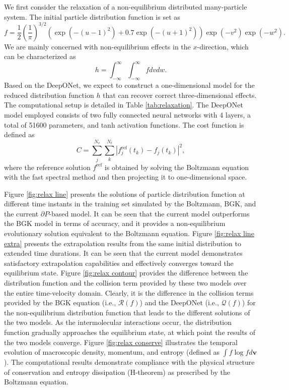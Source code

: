 \documentclass[preprint,3p,12pt,sort&compress]{elsarticle}
\begin{document}
We first consider the relaxation of a non-equilibrium distributed many-particle system.
The initial particle distribution function is set as
\begin{equation}
    f = \frac{1}{2}\left(\frac{1}{\pi}\right)^{3/2}(\exp(-(u-1)^2)+0.7\exp(-(u+1)^2))\exp(-v^2)\exp(-w^2).
    \label{eq:initial pdf}
\end{equation}
We are mainly concerned with non-equilibrium effects in the $x$-direction, which can be characterized as
\begin{equation}
    h=\int_{-\infty}^\infty \int_{-\infty}^\infty f dvdw.
\end{equation}
Based on the DeepONet, we expect to construct a one-dimensional model for the reduced distribution function $h$ that can recover correct three-dimensional effects.
The computational setup is detailed in Table \ref{tab:relaxation}.
The DeepONet model employed consists of two fully connected neural networks with 4 layers, a total of 51600 parameters, and tanh activation functions.
The cost function is defined as
\begin{equation}
    C = \sum_j^{N_v}\sum_k^{N_t} |f_{j}^{\mathrm{ref}}(t_k)-f_{j}(t_k)|^2,
\end{equation}
where the reference solution $f^\mathrm{ref}$ is obtained by solving the Boltzmann equation with the fast spectral method \cite{mouhot2006fast,wu2013deterministic} and then projecting it to one-dimensional space.

Figure \ref{fig:relax line} presents the solutions of particle distribution function at different time instants in the training set simulated by the Boltzmann, BGK, and the current $\partial P$-based model.
It can be seen that the current model outperforms the BGK model in terms of accuracy, and it provides a non-equilibrium evolutionary solution equivalent to the Boltzmann equation.
Figure \ref{fig:relax line extra} presents the extrapolation results from the same initial distribution to extended time durations.
It can be seen that the current model demonstrates satisfactory extrapolation capabilities and effectively converges toward the equilibrium state.
Figure \ref{fig:relax contour} provides the difference between the distribution function and the collision term provided by these two models over the entire time-velocity domain.
Clearly, it is the difference in the collision terms provided by the BGK equation (i.e., $\mathcal R(f)$) and the DeepONet (i.e., $\mathcal Q(f)$) for the non-equilibrium distribution function that leads to the different solutions of the two models.
As the intermolecular interactions occur, the distribution function gradually approaches the equilibrium state, at which point the results of the two models converge.
Figure \ref{fig:relax conserve} illustrates the temporal evolution of macroscopic density, momentum, and entropy (defined as $\int f \log f d\mathbf v$).
The computational results demonstrate compliance with the physical structure of conservation and entropy dissipation (H-theorem) as prescribed by the Boltzmann equation.
\end{document}
